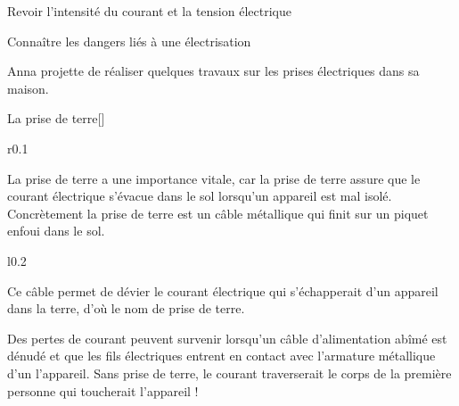 \tetePremStssElec
\vspace*{-36pt}


\begin{objectifs}
  \item Revoir l'intensité du courant et la tension électrique
  \item Connaître les dangers liés à une électrisation
\end{objectifs}

\begin{contexte}
  Anna projette de réaliser quelques travaux sur les prises électriques dans sa maison.
  
\end{contexte}


\begin{doc}{La prise de terre}[\label{doc:prise_terre}]
  \begin{wrapfigure}[3]{r}{0.1\linewidth}
    \centering
    \vspace*{-32pt}
  \end{wrapfigure}
  La prise de terre a une importance vitale, car la prise de terre assure que le courant électrique s'évacue dans le sol lorsqu'un appareil est mal isolé.
  Concrètement la prise de terre est un câble métallique qui finit sur un piquet enfoui dans le sol.
  
  \begin{wrapfigure}{l}{0.2\linewidth}
    \centering
    \vspace*{-14pt}
  \end{wrapfigure}
  Ce câble permet de dévier le courant électrique qui s'échapperait d'un appareil dans la terre, d'où le nom de prise de terre.

  Des pertes de courant peuvent survenir lorsqu'un câble d'alimentation abîmé est dénudé et que les fils électriques entrent en contact avec l'armature métallique d'un l'appareil.
  Sans prise de terre, le courant traverserait le corps de la première personne qui toucherait l'appareil !
\end{doc}

